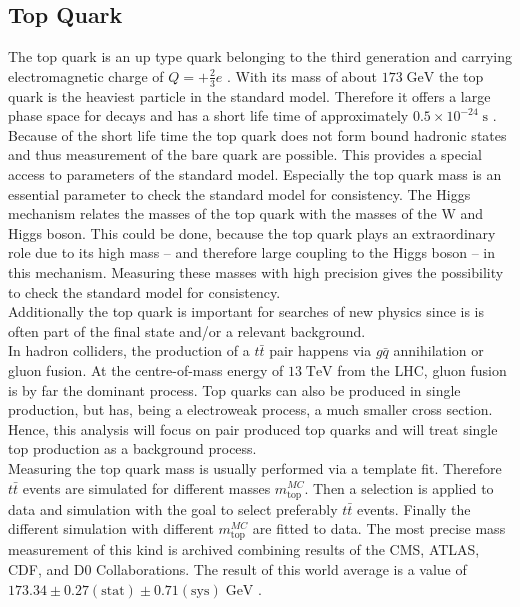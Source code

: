 \subsection{Top Quark}
	The top quark is an up type quark belonging to the third generation and carrying electromagnetic charge of $Q=+\frac{2}{3}e$ \cite{pdg2016}. With its mass of about $173\;\text{GeV}$ the top quark is the heaviest particle in the standard model. Therefore it offers a large phase space for decays and  has a short life time of approximately $0.5 \times 10^{-24}\;\text{s}$ \cite{pdg2016}. Because of the short life time the top quark does not form bound hadronic states and thus measurement of the bare quark are possible. This provides a special access to parameters of the standard model. Especially the top quark mass is an essential parameter to check the standard model for consistency. The Higgs mechanism relates the masses of the top quark with the masses of the W and Higgs boson. This could be done, because the top quark plays an extraordinary role due to its high mass -- and therefore large coupling to the Higgs boson -- in this mechanism. Measuring these masses with high precision gives the possibility to check the standard model for consistency. 
	\\
	Additionally the top quark is important for searches of new physics since is is often part of the final state and/or a relevant background. 
	\\
	In hadron colliders, the production of a $t\bar{t}$ pair happens via $g\bar{q}$ annihilation or gluon fusion. At the centre-of-mass energy of $13\;\text{TeV}$ from the LHC, gluon fusion is by far the dominant process. Top quarks can also be produced in single production, but has, being a electroweak process, a much smaller cross section. Hence, this analysis will focus on pair produced top quarks and will treat single top production as a background process.
	\\
	Measuring the top quark mass is usually performed via a template fit. Therefore $t\bar{t}$ events are simulated for different masses $m_\text{top}^{MC}$. Then a selection is applied to data and simulation with the goal to select preferably $t\bar{t}$ events. Finally the different simulation with different $m_\text{top}^{MC}$ are fitted to data.	The most precise mass measurement of this kind is archived combining results of the CMS, ATLAS, CDF, and D0 Collaborations. The result of this world average is a value of $173.34 \pm 0.27 (\text{stat}) \pm 0.71 (\text{sys})\;\text{GeV}$ \cite{topmass_combination}. 
